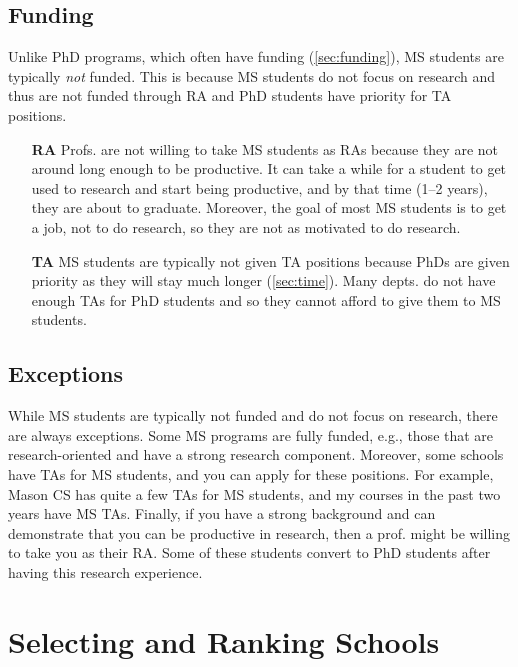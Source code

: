 \documentclass[oneside,11pt,dvipsnames]{book}
\newcommand{\sectioninfo}[1]{%
  \phantomsection
  \addcontentsline{toc}{sectioninfo}{\textcolor{black}{\emph{#1}}}%
}
\begin{document}
\subsection{Funding}\label{sec:ms-funding}
Unlike PhD programs, which often have funding (\autoref{sec:funding}), MS students are typically \emph{not} funded. This is because MS students do not focus on research and thus are not funded through RA and PhD students have priority for TA positions. 

\begin{itemize}
\item[\textbf{RA}] Profs. are not willing to take MS students as RAs because they are not around long enough to be productive. It can take a while for a student to get used to research and start being productive, and by that time (1--2 years), they are about to graduate. Moreover, the goal of most MS students is to get a job, not to do research, so they are not as motivated to do research.

\item[\textbf{TA}] MS students are typically not given TA positions because PhDs are given priority as they will stay much longer (\autoref{sec:time}). Many depts. do not have enough TAs for PhD students and so they cannot afford to give them to MS students.
\end{itemize}

\subsection{Exceptions} 
While MS students are typically not funded and do not focus on research, there are always exceptions.
Some MS programs are fully funded, e.g., those that are research-oriented and have a strong research component.
Moreover, some schools have TAs for MS students, and you can apply for these positions. For example, Mason CS has quite a few TAs for MS students, and my courses in the past two years have MS TAs.
Finally, if you have a strong background and can demonstrate that you can be productive in research, then a prof. might be willing to take you as their RA.  Some of these students convert to PhD students after having this research experience.

\section{Selecting and Ranking Schools}\label{sec:selecting-ranking-schools-ms}
\end{document}
